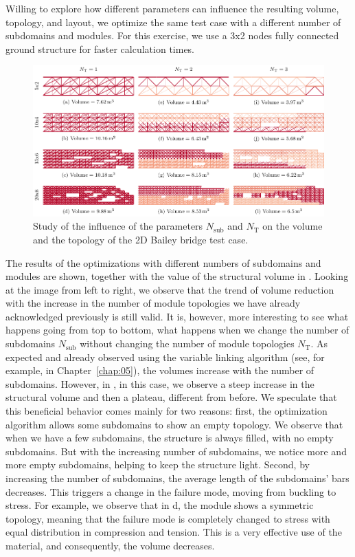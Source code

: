 Willing to explore how different parameters can influence the resulting volume, topology, and layout, we optimize the same test case with a different number of subdomains and modules. For this exercise, we use a 3x2 nodes fully connected ground structure for faster calculation times.

\begin{figure}
    \centering
    \includegraphics{figures/06_DMO/00_tug_bench_size/size.pdf}
    \caption{Study of the influence of the parameters $N_\text{sub}$ and $N_\text{T}$ on the volume and the topology of the 2D Bailey bridge test case.}
    \label{fig:06_size_res}
\end{figure}

The results of the optimizations with different numbers of subdomains and modules are shown, together with the value of the structural volume in . Looking at the image from left to right, we observe that the trend of volume reduction with the increase in the number of module topologies we have already acknowledged previously is still valid. It is, however, more interesting to see what happens going from top to bottom, \ie what happens when we change the number of subdomains $N_\text{sub}$ without changing the number of module topologies $N_\text{T}$. As expected and already observed using the variable linking algorithm (see, for example,  in Chapter~\ref{chap:05}), the volumes increase with the number of subdomains. However, in , in this case, we observe a steep increase in the structural volume and then a plateau, different from before. We speculate that this beneficial behavior comes mainly for two reasons: first, the optimization algorithm allows some subdomains to show an empty topology. We observe that when we have a few subdomains, the structure is always filled, with no empty subdomains. But with the increasing number of subdomains, we notice more and more empty subdomains, helping to keep the structure light. Second, by increasing the number of subdomains, the average length of the subdomains' bars decreases. This triggers a change in the failure mode, moving from buckling to stress. For example, we observe that in d, the module shows a symmetric topology, meaning that the failure mode is completely changed to stress with equal distribution in compression and tension. This is a very effective use of the material, and consequently, the volume decreases.


